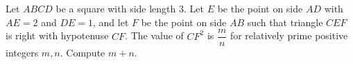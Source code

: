 Let $ABCD$ be a square with side length $3$. Let $E$ be the point on side $AD$ with $AE=2$ and $DE=1$, and let $F$ be the point on side $AB$ such that triangle $CEF$ is right with hypotenuse $CF$. The value of $CF^2$ is $\dfrac mn$ for relatively prime positive integers $m,n$. Compute $m+n$.
